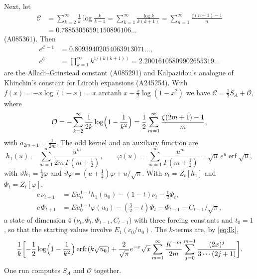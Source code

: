 \documentclass[11pt]{amsart}
\theoremstyle{definition}
\theoremstyle{remark}
\newcommand{\erfc}{\operatorname{erfc}}
\newcommand{\erf}{\operatorname{erf}}
\newcommand{\arctanh}{\operatorname{arctanh}}
\begin{document}
Next, let
\begin{align*}
  \mathcal C &= \sum_{k=2}^{\infty}\frac1k\log\frac{k}{k-1} = \sum_{k=1}^{\infty}\frac{\log k}{k(k+1)} = \sum_{n=1}^{\infty}\frac{\zeta(n+1)-1}{n} \\
  &= 0.78853056591150896106\ldots
\end{align*}
(A085361). Then
\begin{align*}
  e^{\mathcal C-1} &= 0.80939402054063913071\ldots, \\
  e^{\mathcal C} &= \prod_{k=1}^{\infty}k^{1/(k(k+1))} = 2.20016105809902655319\ldots
\end{align*}
are the Alladi--Grinstead constant \cite{AG77} (A085291) and Kalpazidou's analogue of Khinchin's constant for
L\"uroth expansions \cite{Kal88} (A245254). With
$f(x) = -x\log(1-x) = x\arctanh x - \frac x2\log(1-x^2)$ we have $\mathcal C = \frac12S_A + \mathcal O$, where
\[
  \mathcal O = -\sum_{k=2}^{\infty}\frac{1}{2k}\log\Bigl(1-\frac1{k^2}\Bigr) = \frac12\sum_{m=1}^{\infty}\frac{\zeta(2m+1)-1}{m},
\]
with $a_{2m+1} = \frac1{2m}$. The odd kernel and an auxiliary function are
\[
  h_1(u) = \sum_{m=1}^{\infty}\frac{u^m}{2m\,\Gamma(m+\frac12)}, \qquad
  \varphi(u) = \sum_{m=1}^{\infty}\frac{u^m}{\Gamma(m+\frac12)} = \sqrt u\,e^u\erf\sqrt u,
\]
with $\vartheta h_1 = \frac12\varphi$ and $\vartheta\varphi = (u+\frac12)\varphi + u/\sqrt\pi$. With $\nu_t = Z_t[h_1]$ and
$\Phi_t = Z_t[\varphi]$,
\begin{align*}
  c\,\nu_{t+1} &= Eu_0^{1-t}h_1(u_0) - (1-t)\nu_t - \tfrac12\Phi_t, \\
  c\,\Phi_{t+1} &= Eu_0^{1-t}\varphi(u_0) - (\tfrac32-t)\Phi_t - \Phi_{t-1} - C_{t-1}/\sqrt\pi,
\end{align*}
a state of dimension $4$ ($\nu_t, \Phi_t, \Phi_{t-1}, C_{t-1}$) with three forcing constants and $t_0 = 1$, so that the
starting values involve $E_1(c_0/u_0)$. The $k$-terms are, by \eqref{eq:Ik},
\[
  \frac1k\biggl[-\frac12\log\Bigl(1-\frac1{k^2}\Bigr)\erfc(k\sqrt{u_0})
  + \frac{2}{\sqrt\pi}e^{-x}\sqrt x\sum_{m=1}^{\infty} \frac{K^{-m}}{2m}\sum_{j=0}^{m-1}\frac{(2x)^j}{3\cdots(2j+1)}\biggr].
\]
One run computes $S_A$ and $\mathcal O$ together.
\end{document}
